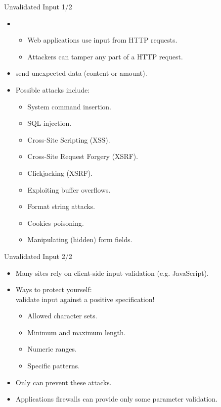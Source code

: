 \documentclass{beamer}
\begin{document}
\begin{slide}{Unvalidated Input 1/2}
  \begin{itemize}\itemsep=2ex
    \item {}
    \begin{itemize}\itemsep=1ex
      \item Web applications use input from HTTP requests.
      \item Attackers can tamper any part of a HTTP request.
    \end{itemize}
    \item {} send unexpected data (content or amount). 
    \item Possible attacks include:
    \begin{itemize}\itemsep=1ex
      \item System command insertion.
      \item \alert<2>{SQL injection.}
      \item \alert<2>{Cross-Site Scripting (XSS).}
      \item \alert<2>{Cross-Site Request Forgery (XSRF).}
      \item \alert<2>{Clickjacking (XSRF).}
      \item Exploiting buffer overflows.
      \item Format string attacks.
      \item Cookies poisoning.
      \item Manipulating (hidden) form fields.
    \end{itemize}
  \end{itemize}
\end{slide}
\begin{slide}{Unvalidated Input 2/2}
  \begin{itemize}\itemsep=1ex
    \item Many sites rely on client-side input validation (e.g. JavaScript).
    \item Ways to protect yourself: \\[1ex]
          \alert{validate input against a positive specification!}
    \begin{itemize}\itemsep=1ex
      \item Allowed character sets.
      \item Minimum and maximum length.
      \item Numeric ranges.
      \item Specific patterns.
    \end{itemize}
    \item Only  can prevent these attacks.
    \item Applications firewalls can provide only some parameter validation.
  \end{itemize}
\end{slide}
\end{document}
